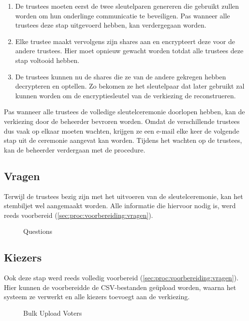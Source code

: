 \begin{enumerate}
  \item De trustees moeten eerst de twee sleutelparen genereren die gebruikt zullen worden om hun onderlinge communicatie te beveiligen. Pas wanneer alle trustees deze stap uitgevoerd hebben, kan verdergegaan worden.
  \item Elke trustee maakt vervolgens zijn shares aan en encrypteert deze voor de andere trustees. Hier moet opnieuw gewacht worden totdat alle trustees deze stap voltooid hebben.
  \item De trustees kunnen nu de shares die ze van de andere gekregen hebben decrypteren en optellen. Zo bekomen ze het sleutelpaar dat later gebruikt zal kunnen worden om de encryptiesleutel van de verkiezing de reconstrueren.
\end{enumerate}

Pas wanneer alle trustees de volledige sleutelceremonie doorlopen hebben, kan de verkiezing door de beheerder bevroren worden. Omdat de verschillende trustees dus vaak op elkaar moeten wachten, krijgen ze een e-mail elke keer de volgende stap uit de ceremonie aangevat kan worden. Tijdens het wachten op de trustees, kan de beheerder verdergaan met de procedure.

\subsection{Vragen}

Terwijl de trustees bezig zijn met het uitvoeren van de sleutelceremonie, kan het stembiljet wel aangemaakt worden. Alle informatie die hiervoor nodig is, werd reeds voorbereid (\ref{sec:proc:voorbereiding:vragen}).

\begin{figure}
  \caption{Questions}
  \label{fig:proc:questions}
\end{figure}

\subsection{Kiezers}

Ook deze stap werd reeds volledig voorbereid (\ref{sec:proc:voorbereiding:vragen}). Hier kunnen de voorbereidde de CSV-bestanden ge\"upload worden, waarna het systeem ze verwerkt en alle kiezers toevoegt aan de verkiezing.

\begin{figure}
  \caption{Bulk Upload Voters}
  \label{fig:proc:voters_upload}
\end{figure}

